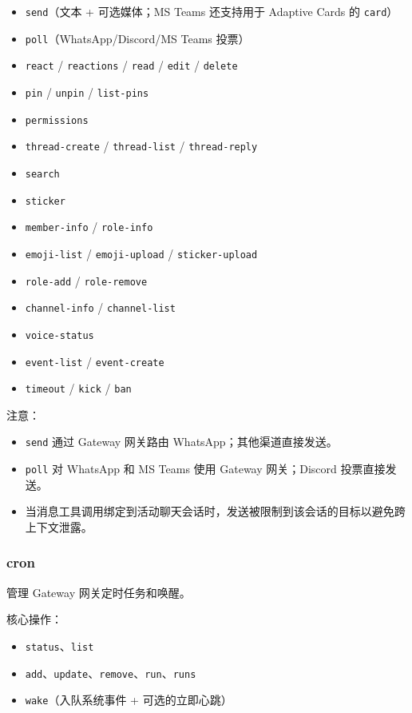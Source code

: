 \begin{itemize}
  \item \texttt{send}（文本 + 可选媒体；MS Teams 还支持用于 Adaptive Cards 的 \texttt{card}）
  \item \texttt{poll}（WhatsApp/Discord/MS Teams 投票）
  \item \texttt{react} / \texttt{reactions} / \texttt{read} / \texttt{edit} / \texttt{delete}
  \item \texttt{pin} / \texttt{unpin} / \texttt{list-pins}
  \item \texttt{permissions}
  \item \texttt{thread-create} / \texttt{thread-list} / \texttt{thread-reply}
  \item \texttt{search}
  \item \texttt{sticker}
  \item \texttt{member-info} / \texttt{role-info}
  \item \texttt{emoji-list} / \texttt{emoji-upload} / \texttt{sticker-upload}
  \item \texttt{role-add} / \texttt{role-remove}
  \item \texttt{channel-info} / \texttt{channel-list}
  \item \texttt{voice-status}
  \item \texttt{event-list} / \texttt{event-create}
  \item \texttt{timeout} / \texttt{kick} / \texttt{ban}
\end{itemize}


注意：

\begin{itemize}
  \item \texttt{send} 通过 Gateway 网关路由 WhatsApp；其他渠道直接发送。
  \item \texttt{poll} 对 WhatsApp 和 MS Teams 使用 Gateway 网关；Discord 投票直接发送。
  \item 当消息工具调用绑定到活动聊天会话时，发送被限制到该会话的目标以避免跨上下文泄露。
\end{itemize}


\subsubsection{cron}


管理 Gateway 网关定时任务和唤醒。

核心操作：

\begin{itemize}
  \item \texttt{status}、\texttt{list}
  \item \texttt{add}、\texttt{update}、\texttt{remove}、\texttt{run}、\texttt{runs}
  \item \texttt{wake}（入队系统事件 + 可选的立即心跳）
\end{itemize}


